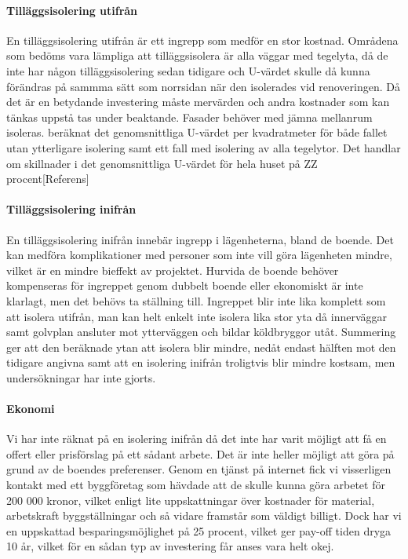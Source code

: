 \paragraph{Tilläggsisolering utifrån}
En tilläggsisolering utifrån är ett ingrepp som medför en stor kostnad. Områdena som bedöms vara lämpliga att tilläggsisolera är alla väggar med tegelyta, då de inte har någon tilläggsisolering sedan tidigare och U-värdet skulle då kunna förändras på sammma sätt som norrsidan när den isolerades vid renoveringen. Då det är en betydande investering måste mervärden och andra kostnader som kan tänkas uppstå tas under beaktande. Fasader behöver med jämna mellanrum isoleras. beräknat det genomsnittliga U-värdet per kvadratmeter för både fallet utan ytterligare isolering samt ett fall med isolering av alla tegelytor. Det handlar om skillnader i det genomsnittliga U-värdet för hela huset på ZZ procent[Referens]

\paragraph{Tilläggsisolering inifrån}
En tilläggsisolering inifrån innebär ingrepp i lägenheterna, bland de boende. Det kan medföra komplikationer med personer som inte vill göra lägenheten mindre, vilket är en mindre bieffekt av projektet. Hurvida de boende behöver kompenseras för ingreppet genom dubbelt boende eller ekonomiskt är inte klarlagt, men det behövs ta ställning till. Ingreppet blir inte lika komplett som att isolera utifrån, man kan helt enkelt inte isolera lika stor yta då innerväggar samt golvplan ansluter mot ytterväggen och bildar köldbryggor utåt. Summering ger att den beräknade ytan att isolera blir mindre, nedåt endast hälften mot den tidigare angivna samt att en isolering inifrån troligtvis blir mindre kostsam, men undersökningar har inte gjorts.

\paragraph{Ekonomi}
Vi har inte räknat på en isolering inifrån då det inte har varit möjligt att få en offert eller prisförslag på ett sådant arbete. Det är inte heller möjligt att göra på grund av de boendes preferenser. Genom en tjänst på internet fick vi visserligen kontakt med ett byggföretag som hävdade att de skulle kunna göra arbetet för 200 000 kronor, vilket enligt lite uppskattningar över kostnader för material, arbetskraft byggställningar och så vidare framstår som väldigt billigt. Dock har vi en uppskattad besparingsmöjlighet på 25 procent, vilket ger pay-off tiden dryga 10 år, vilket för en sådan typ av investering får anses vara helt okej.

